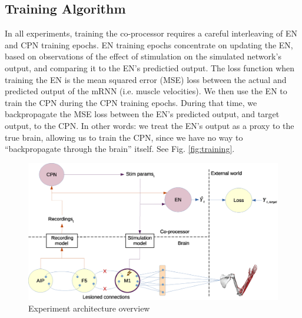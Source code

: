 \documentclass[12pt]{iopart}
\begin{document}
\subsection{Training Algorithm}
In all experiments, training the co-processor requires a careful interleaving of
EN and CPN training epochs. EN training epochs concentrate on updating the EN,
based on observations of the effect of stimulation on the simulated network's output,
and comparing it to the EN's predictied output. The loss function when training the
EN is the mean squared error (MSE) loss between the actual and predicted output of
the mRNN (i.e. muscle velocities). We then use the EN to train the CPN during the
CPN training epochs. During that time, we backpropagate the MSE loss between the
EN's predicted output, and target output, to the CPN. In other words: we treat the
EN's output as a proxy to the true brain, allowing us to train the CPN, since we
have no way to ``backpropagate through the brain'' itself.
See Fig. \ref{fig:training}.

\begin{figure}
\includegraphics[width=\textwidth]{cpn_michaels_arch_labeled.eps}
\caption{Experiment architecture overview}
\centering
\label{fig:exp_overview}
\end{figure}
\end{document}
